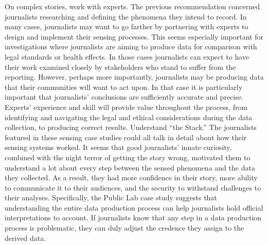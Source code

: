 \begin{itemize}
On complex stories, work with experts.
The previous recommendation concerned journalists researching and defining
the phenomena they intend to record. In many cases, journalists may
want to go farther by partnering with experts to design and implement their
sensing processes. This seems especially important for investigations where
journalists are aiming to produce data for comparison with legal standards
or health effects. In those cases journalists can expect to have their work
examined closely by stakeholders who stand to suffer from the reporting.
However, perhaps more importantly, journalists may be producing data
that their communities will want to act upon. In that case it is particularly
important that journalists' conclusions are sufficiently accurate and precise.
Experts' experience and skill will provide value throughout the process,
from identifying and navigating the legal and ethical considerations during
the data collection, to producing correct results.
Understand ``the Stack.''
The journalists featured in these sensing case studies could all talk in detail
about how their sensing systems worked. It seems that good journalists'
innate curiosity, combined with the night terror of getting the story wrong,
motivated them to understand a lot about every step between the sensed
phenomena and the data they collected. As a result, they had more confidence
in their story, more ability to communicate it to their audiences,
and the security to withstand challenges to their analyses. Specifically, the
Public Lab case study suggests that understanding the entire data production
process can help journalists hold official interpretations to account. If
journalists know that any step in a data production process is problematic,
they can duly adjust the credence they assign to the derived data.


\end{itemize}
